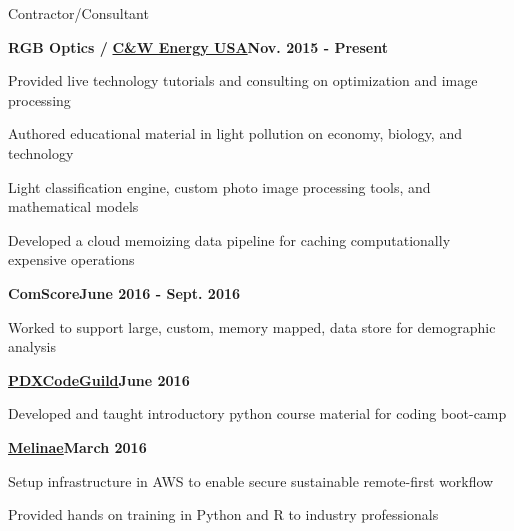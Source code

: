 \documentclass{article}
\newenvironment{**mylist}[2]{
  \subsubsection*{#1\hfill\small#2}
  \small
  \begin{list}{}{}
   \setlength{\topsep}{0pt}
   \setlength{\itemsep}{1pt}
   \setlength{\parskip}{0pt}
   \setlength{\parsep}{0pt}}{\end{list}\normalsize}
\newcommand{\LU}[1]{\hspace{-1em}{\bf Languages Used : #1}}
\begin{document}
\begin{**mylist}{Contractor/Consultant}{}
\item \hspace{-1em}
  {\bf{RGB Optics} / }\href{http://cwenergyusa.com/star-friendly/}{\bf{C\&W Energy USA}}\hfill{\bf{Nov. 2015 - Present}}
\item Provided live technology tutorials and consulting on optimization and image processing
\item Authored educational material in light pollution on economy, biology, and technology
\item Light classification engine, custom photo image processing tools, and mathematical models
\item Developed a cloud memoizing data pipeline for caching computationally expensive operations
\item \hspace{-1em}
  {\bf{ComScore}}\hfill{\bf{June 2016 - Sept. 2016}}
\item Worked to support large, custom, memory mapped, data store for demographic analysis
\item \hspace{-1em}
  \href{http://pdxcodeguild.com/}{\bf{PDXCodeGuild}}\hfill{\bf{June 2016}}
\item Developed and taught introductory python course material for coding boot-camp
  \pagebreak
\item \hspace{-1em}
  \href{http://www.melinae.com/}{\bf{Melinae}}\hfill{\bf{March 2016}}
\item Setup infrastructure in AWS to enable secure sustainable remote-first workflow
\item Provided hands on training in Python and R to industry professionals
\item \LU{Python, R, AWS, PostgreSQL, Perl, C++}
\end{**mylist}

\begin{comment}
\vspace{2em}
       {\center {\em\footnotesize continued...}\par}
\end{comment}
\end{document}
